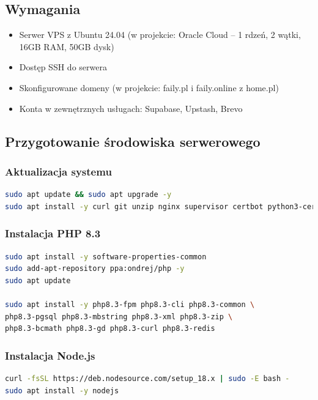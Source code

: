 \documentclass[12pt,a4paper]{article}
\begin{document}
\subsection{Wymagania}

\begin{itemize}[itemsep=1pt]
    \item Serwer VPS z Ubuntu 24.04 (w projekcie: Oracle Cloud -- 1 rdzeń, 2 wątki, 16GB RAM, 50GB dysk)
    \item Dostęp SSH do serwera
    \item Skonfigurowane domeny (w projekcie: faily.pl i faily.online z home.pl)
    \item Konta w zewnętrznych usługach: Supabase, Upstash, Brevo
\end{itemize}

\subsection{Przygotowanie środowiska serwerowego}

\subsubsection{Aktualizacja systemu}
\begin{lstlisting}[language=bash, caption=Aktualizacja Ubuntu i instalacja pakietów]
sudo apt update && sudo apt upgrade -y
sudo apt install -y curl git unzip nginx supervisor certbot python3-certbot-nginx
\end{lstlisting}

\subsubsection{Instalacja PHP 8.3}
\begin{lstlisting}[language=bash, caption=Instalacja PHP i rozszerzeń]
sudo apt install -y software-properties-common
sudo add-apt-repository ppa:ondrej/php -y
sudo apt update

sudo apt install -y php8.3-fpm php8.3-cli php8.3-common \
php8.3-pgsql php8.3-mbstring php8.3-xml php8.3-zip \
php8.3-bcmath php8.3-gd php8.3-curl php8.3-redis
\end{lstlisting}

\subsubsection{Instalacja Node.js}
\begin{lstlisting}[language=bash, caption=Instalacja Node.js 18.x]
curl -fsSL https://deb.nodesource.com/setup_18.x | sudo -E bash -
sudo apt install -y nodejs
\end{lstlisting}
\end{document}
